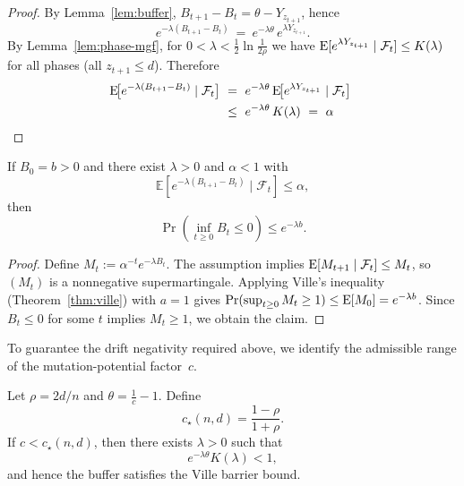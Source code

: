 \begin{proof}
	By Lemma~\ref{lem:buffer}, $B_{t+1}-B_t=\theta-Y_{z_{t+1}}$, hence
	\[
	e^{-\lambda(B_{t+1}-B_t)}\ =\ e^{-\lambda\theta}\,e^{\lambda Y_{z_{t+1}}}.
	\]
	By Lemma~\ref{lem:phase-mgf}, for $0<\lambda<\tfrac12\ln\!\tfrac{1}{2\rho}$ we have %
	$\text{E}[e^{\lambda Y_{z_{t+1}}}\mid\mathcal F_t]\le K(\lambda)$ for all phases (all $z_{t+1}\le d$). Therefore
	\begin{align*}
		\text{E}\!\big[e^{-\lambda(B_{t+1}-B_t)}\mid \mathcal F_t\big]
		\ &=\ e^{-\lambda\theta}\,\text{E}\!\big[e^{\lambda Y_{z_{t+1}}}\mid\mathcal F_t\big]
		\ \\ &\le\ e^{-\lambda\theta}\,K(\lambda)
		\ =\ \alpha	
	\end{align*}
\end{proof}



\begin{corollary}
	\label{cor:ville-exponential}
	
	If $B_0=b>0$ and there exist $\lambda>0$ and $\alpha<1$ with
	\[
	\mathbb{E}[e^{-\lambda(B_{t+1}-B_t)}\mid\mathcal{F}_t]\le\alpha,
	\]
	then
	\[
	\Pr\!\left(\inf_{t\ge0} B_t \le 0\right) \le e^{-\lambda b}.
	\]
\end{corollary}

\begin{proof}
	Define $M_t:=\alpha^{-t}e^{-\lambda B_t}$. The assumption implies
	$\text{E}[M_{t+1}\mid\mathcal F_t]\le M_t$, so $(M_t)$ is a nonnegative supermartingale.
	Applying Ville’s inequality (Theorem~\ref{thm:ville}) with $a=1$ gives
	$\Pr(\sup_{t\ge 0} M_t\ge 1)\le \text{E}[M_0]=e^{-\lambda b}$.
	Since $B_t\le 0$ for some $t$ implies $M_t\ge 1$, we obtain the claim.
	
\end{proof}


To guarantee the drift negativity required above, we identify the admissible 
range of the mutation-potential factor~$c$.

\begin{lemma}%
	 \label{lem:c-threshold-instance}
	
	Let $\rho=2d/n$ and $\theta=\frac{1}{c}-1$.  
	Define
	\[
	c_\star(n,d)=\frac{1-\rho}{1+\rho}.
	\]
	If $c<c_\star(n,d)$, then there exists $\lambda>0$ such that
	\[
	e^{-\lambda\theta}K(\lambda) < 1,
	\]
	and hence the buffer satisfies the Ville barrier bound.
\end{lemma}

